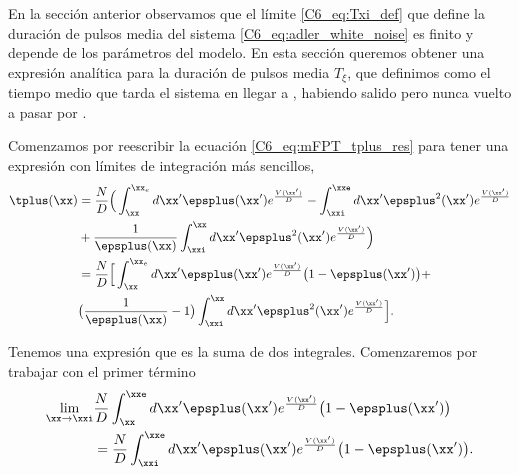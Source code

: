 {En la sección anterior observamos que el límite \ref{C6_eq:Txi_def} que define la duración de pulsos media del sistema \ref{C6_eq:adler_white_noise} es finito y depende de los parámetros del modelo. En esta sección queremos obtener una expresión analítica para la duración de pulsos media $T_\xi$, que definimos como el tiempo medio que tarda el sistema en llegar a \xxe, habiendo salido pero nunca vuelto a pasar por \xxi.


Comenzamos por reescribir la ecuación \ref{C6_eq:mFPT_tplus_res} para tener una expresión con límites de integración más sencillos,
\begin{align}
     \tplus(\xx)&= \frac{N}{D} \Big(  \int_\xx^{\xx_e} d \xx' \epsplus(\xx') e^{ \frac{V(\xx')}{D}} -  \int_{\xxi}^{\xxe} d\xx'  \epsplus^2(\xx') e^{ \frac{V(\xx')}{D}} \nonumber \\ & + \frac{1}{\epsplus(\xx)} \int_{\xxi}^{\xx} d\xx'  \epsplus^2(\xx') e^{ \frac{V(\xx')}{D}} \Big) \\
     &= \frac{N}{D} \Big[  \int_\xx^{\xx_e} d \xx' \epsplus(\xx') e^{ \frac{V(\xx')}{D}} \big(1 - \epsplus(\xx') \big)+ \nonumber \\ & \big( \frac{1}{\epsplus(\xx)} -1 \big) \int_{\xxi}^{\xx} d\xx'  \epsplus^2(\xx') e^{ \frac{V(\xx')}{D}} \Big]. \label{C6_eq:Txi_tplus_terminos}
\end{align}

Tenemos una expresión que es la suma de dos integrales. Comenzaremos por trabajar con el primer término 
\begin{align}
     \lim_{\xx \rightarrow   \xxi }&\frac{N}{D}  \int_\xx^{\xxe} d \xx' \epsplus(\xx') e^{ \frac{V(\xx')}{D}} \big(1 - \epsplus(\xx') \big) \\
     &= \frac{N}{D} \int_{\xxi}^{\xxe} d \xx' \epsplus(\xx') e^{ \frac{V(\xx')}{D}} \big(1 - \epsplus(\xx') \big).
     \label{C6_eq:Txi_LI1}
\end{align}


}
